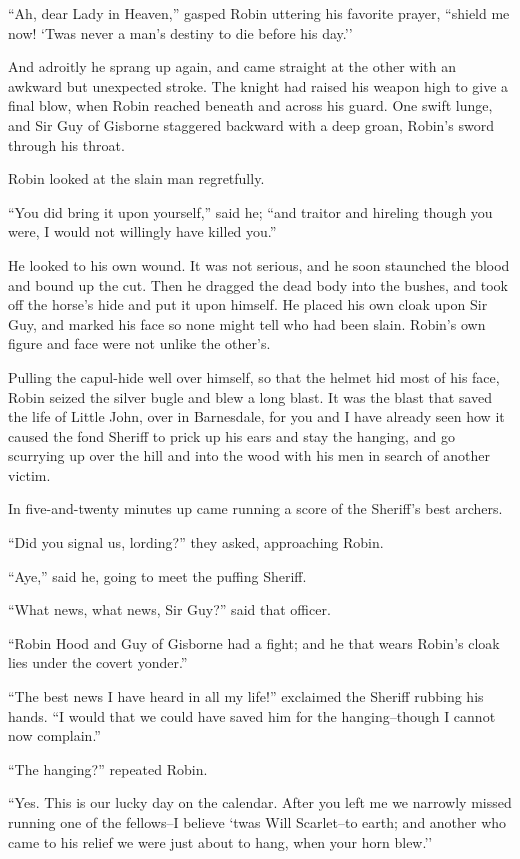 ``Ah, dear Lady in Heaven,'' gasped Robin uttering his favorite prayer,
``shield me now! `Twas never a man's destiny to die before his day.''

And adroitly he sprang up again, and came straight at the other with an
awkward but unexpected stroke. The knight had raised his weapon high to
give a final blow, when Robin reached beneath and across his guard. One
swift lunge, and Sir Guy of Gisborne staggered backward with a deep
groan, Robin's sword through his throat.

Robin looked at the slain man regretfully.

``You did bring it upon yourself,'' said he; ``and traitor and hireling
though you were, I would not willingly have killed you.''

He looked to his own wound. It was not serious, and he soon staunched
the blood and bound up the cut. Then he dragged the dead body into the
bushes, and took off the horse's hide and put it upon himself. He placed
his own cloak upon Sir Guy, and marked his face so none might tell who
had been slain. Robin's own figure and face were not unlike the other's.

Pulling the capul-hide well over himself, so that the helmet hid most of
his face, Robin seized the silver bugle and blew a long blast. It was
the blast that saved the life of Little John, over in Barnesdale, for
you and I have already seen how it caused the fond Sheriff to prick up
his ears and stay the hanging, and go scurrying up over the hill and
into the wood with his men in search of another victim.

In five-and-twenty minutes up came running a score of the Sheriff's best
archers.

``Did you signal us, lording?'' they asked, approaching Robin.

``Aye,'' said he, going to meet the puffing Sheriff.

``What news, what news, Sir Guy?'' said that officer.

``Robin Hood and Guy of Gisborne had a fight; and he that wears Robin's
cloak lies under the covert yonder.''

``The best news I have heard in all my life!'' exclaimed the Sheriff
rubbing his hands. ``I would that we could have saved him for the
hanging--though I cannot now complain.''

``The hanging?'' repeated Robin.

``Yes. This is our lucky day on the calendar. After you left me we
narrowly missed running one of the fellows--I believe `twas Will
Scarlet--to earth; and another who came to his relief we were just about
to hang, when your horn blew.''

